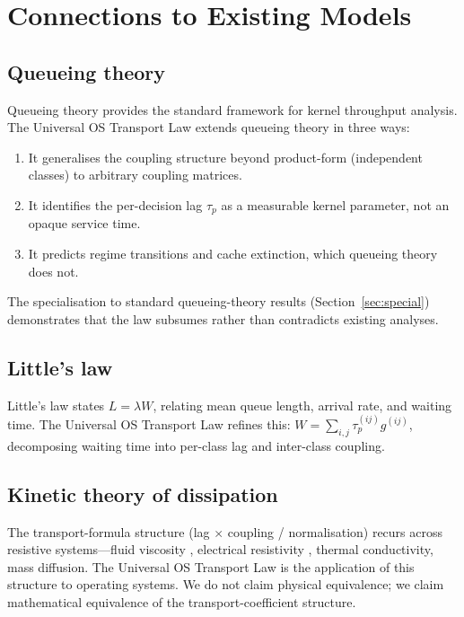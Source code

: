 \documentclass[twocolumn,11pt,a4paper]{article}
\newcommand{\taup}{\tau_p}
\begin{document}
\section{Connections to Existing Models}
\label{sec:connections}

\subsection{Queueing theory}

Queueing theory \citep{kleinrock1975, jackson1957, baskett1975} provides the standard framework for kernel throughput analysis. The Universal OS Transport Law extends queueing theory in three ways:

\begin{enumerate}[nosep,leftmargin=*]
\item It generalises the coupling structure beyond product-form (independent classes) to arbitrary coupling matrices.
\item It identifies the per-decision lag $\taup$ as a measurable kernel parameter, not an opaque service time.
\item It predicts regime transitions and cache extinction, which queueing theory does not.
\end{enumerate}

The specialisation to standard queueing-theory results (Section~\ref{sec:special}) demonstrates that the law subsumes rather than contradicts existing analyses.

\subsection{Little's law}

Little's law \citep{little1961proof} states $L = \lambda W$, relating mean queue length, arrival rate, and waiting time. The Universal OS Transport Law refines this: $W = \sum_{i,j} \taup^{(ij)} g^{(ij)}$, decomposing waiting time into per-class lag and inter-class coupling.

\subsection{Kinetic theory of dissipation}

The transport-formula structure (lag $\times$ coupling / normalisation) recurs across resistive systems---fluid viscosity \citep{chapman1990}, electrical resistivity \citep{drude1900}, thermal conductivity, mass diffusion. The Universal OS Transport Law is the application of this structure to operating systems. We do not claim physical equivalence; we claim mathematical equivalence of the transport-coefficient structure.
\end{document}
